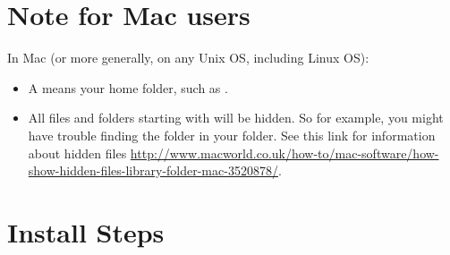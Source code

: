 \documentclass{article}
\begin{document}
\section{Note for Mac users}
\label{sec:Note for Mac users}

In Mac (or more generally, on any Unix OS, including Linux OS):
\begin{itemize}
    \item A \menu{\textasciitilde} means your home folder, such as .
    \item All files and folders starting with  will be hidden.
        So for example, you might have trouble finding the 
        folder in your \menu{\textasciitilde} folder. See this link for information
        about hidden files
        \url{http://www.macworld.co.uk/how-to/mac-software/how-show-hidden-files-library-folder-mac-3520878/}.

\end{itemize}
\section{Install Steps}
\label{sec:Install Steps}
\end{document}
